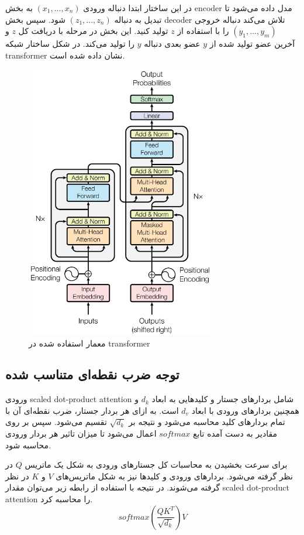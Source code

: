 در این ساختار ابتدا دنباله ورودی $(x_1, ..., x_n)$ به بخش \gls{encoder} مدل داده
می‌شود تا تبدیل به دنباله $(z_1, ..., z_n)$ شود. سپس بخش \gls{decoder} تلاش
می‌کند دنباله خروجی $(y_1, ..., y_m)$ را با استفاده از $z$ تولید کنید. این بخش
در مرحله با دریافت کل $z$ و آخرین عضو تولید شده از $y$ عضو بعدی دنباله $y$ را
تولید می‌کند. در شکل ساختار شبکه \gls{transformer} نشان داده شده است.
\begin{figure}[ht]
    \centering
    \includegraphics[height=12cm]{./statics/transformers_architecture.png}
    \caption{معمار استفاده شده در \gls{transformer}}
\end{figure}

\subsection{توجه ضرب نقطه‌ای متناسب شده}
ورودی \gls{scaled dot-product attention} شامل بردارهای جستار و کلیدهایی به ابعاد
$d_k$ و همچنین بردارهای ورودی با ابعاد $d_v$ است. به ازای هر بردار جستار، ضرب
نقطه‌ای آن با تمام بردارهای کلید محاسبه می‌شود و نتیجه بر $\sqrt{d_k}$ تقسیم
می‌شود. سپس بر روی مقادیر به دست آمده تابع $softmax$ اعمال می‌شود تا میزان تاثیر
هر بردار ورودی محاسبه شود.

برای سرعت بخشیدن به محاسبات کل جستارهای ورودی به شکل یک ماتریس $Q$ در نظر گرفته
می‌شود. بردارهای ورودی و کلیدها نیز به شکل ماتریس‌های $V$ و $K$ در نظر گرفته
می‌شوند. در نتیجه با استفاده از رابطه زیر می‌توان مقدار \gls{scaled dot-product
attention} را محاسبه کرد.
\begin{equation}
    softmax(\frac{QK^T}{\sqrt{d_k}})V
\end{equation}

